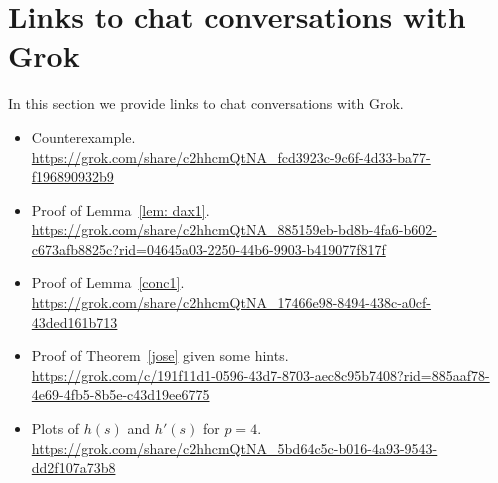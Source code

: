 \documentclass[11pt]{article}
\theoremstyle{definition}
\newcommand{\1}{\mathbf{1}}
\begin{document}











 




\section{Links to chat conversations with Grok}\label{grokchat}

In this section we provide links to chat conversations with Grok. 

\vskip0.5cm 

\begin{itemize}
    \item Counterexample. \\
\url{https://grok.com/share/c2hhcmQtNA_fcd3923c-9c6f-4d33-ba77-f196890932b9} \\

    \item Proof of Lemma~\ref{lem: dax1}. \\
\url{https://grok.com/share/c2hhcmQtNA_885159eb-bd8b-4fa6-b602-c673afb8825c?rid=04645a03-2250-44b6-9903-b419077f817f} \\

    \item Proof of Lemma~\ref{conc1}. \\
\url{https://grok.com/share/c2hhcmQtNA_17466e98-8494-438c-a0cf-43ded161b713} \\


    \item Proof of Theorem~\ref{jose} given some hints. \\
\url{https://grok.com/c/191f11d1-0596-43d7-8703-aec8c95b7408?rid=885aaf78-4e69-4fb5-8b5e-c43d19ee6775} \\

    \item Plots of $h(s)$ and $h'(s)$ for $p=4$. \\
\url{https://grok.com/share/c2hhcmQtNA_5bd64c5c-b016-4a93-9543-dd2f107a73b8} \\


\end{itemize}
\end{document}
